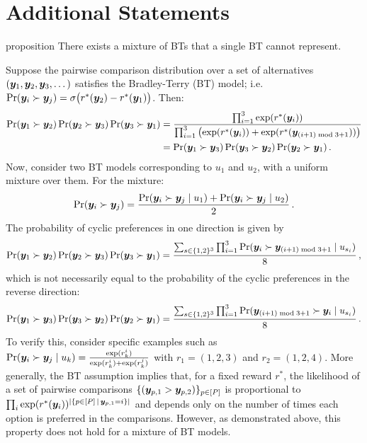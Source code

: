 \section{Additional Statements}

\begin{theoremEnd}[restate]{proposition}
\label{prop:mixture_bt}
There exists a mixture of BTs that a single BT cannot represent.
\end{theoremEnd}
\begin{proofEnd}
    Suppose the pairwise comparison distribution over a set of alternatives \(({\bm{y}}_1, {\bm{y}}_2, {\bm{y}}_3, \dots)\)  satisfies the Bradley-Terry (BT) model; i.e. \(\Pr({\bm{y}}_i \succ {\bm{y}}_j) = \sigma\big(r^*({\bm{y}}_2) - r^*({\bm{y}}_1)\big)\). Then:
    \begin{align*}
    \Pr({\bm{y}}_1 \succ {\bm{y}}_2)\Pr({\bm{y}}_2 \succ {\bm{y}}_3)\Pr({\bm{y}}_3 \succ {\bm{y}}_1) &= \frac{\prod_{i=1}^3 \exp(r^*({\bm{y}}_i))}{\prod_{i=1}^3 \left(\exp(r^*({\bm{y}}_i)) + \exp( r^*({\bm{y}}_{(i+1)\bmod 3 + 1}))\right)}\\
    &= \Pr({\bm{y}}_1 \succ {\bm{y}}_3)\Pr({\bm{y}}_3 \succ {\bm{y}}_2)\Pr({\bm{y}}_2 \succ {\bm{y}}_1)
    \,.
    \end{align*}
    Now, consider two BT models corresponding to \(u_1\) and \(u_2\), with a uniform mixture over them. For the mixture:
    \[
    \Pr({\bm{y}}_i \succ {\bm{y}}_j) = \frac{\Pr({\bm{y}}_i \succ {\bm{y}}_j \mid u_1) + \Pr({\bm{y}}_i \succ {\bm{y}}_j \mid u_2)}{2}
    \,.
    \]
    The probability of cyclic preferences in one direction is given by
    \[
    \Pr({\bm{y}}_1 \succ {\bm{y}}_2)\Pr({\bm{y}}_2 \succ {\bm{y}}_3)\Pr({\bm{y}}_3 \succ {\bm{y}}_1) = \frac{\sum_{s \in \{1, 2\}^3} \prod_{i=1}^3 \Pr({\bm{y}}_i \succ {\bm{y}}_{(i+1)\bmod 3 + 1} \mid u_{s_i})}{8}
    \,,
    \]
    which is not necessarily equal to the probability of the cyclic preferences in the reverse direction:
    \[
    \Pr({\bm{y}}_1 \succ {\bm{y}}_3)\Pr({\bm{y}}_3 \succ {\bm{y}}_2)\Pr({\bm{y}}_2 \succ {\bm{y}}_1) = \frac{\sum_{s \in \{1, 2\}^3} \prod_{i=1}^3 \Pr({\bm{y}}_{(i+1)\bmod 3 + 1} \succ {\bm{y}}_i \mid u_{s_i})}{8}
    \,.
    \]
    To verify this, consider specific examples such as \(\Pr({\bm{y}}_i \succ {\bm{y}}_j \mid u_k) = \frac{\exp(r^i_k)}{\exp(r^i_k) + \exp(r^j_k)}\) with \(r_1 = (1, 2, 3)\) and \(r_2 = (1, 2, 4)\).
    More generally, the BT assumption implies that, for a fixed reward \(r^*\), the likelihood of a set of pairwise comparisons \(\{({\bm{y}}_{p, 1} > {\bm{y}}_{p, 2})\}_{p \in [P]}\) is proportional to \(\prod_i \exp(r^*({\bm{y}}_i))^{|\{p \in [P] \,\mid\, {\bm{y}}_{p, 1} = i\}|}\) and depends only on the number of times each option is preferred in the comparisons. However, as demonstrated above, this property does not hold for a mixture of BT models.
\end{proofEnd}

